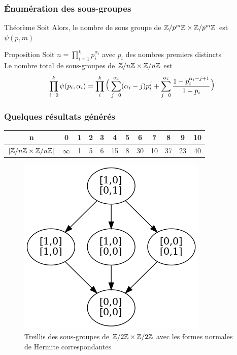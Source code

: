 \documentclass[10pt]{beamer}
\newcommand{\ZpmZ}{\Z/p^m\Z}
\newcommand{\ZZpm}{\ZpmZ \x \ZpmZ}
\begin{document}
\begin{frame}
	\frametitle{\'Enumération des sous-groupes}
	\begin{alertblock}{Théorème}
		Soit
		Alors, le nombre de sous groupe de $\ZZpm$ est $\psi(p,m)$
	\end{alertblock}

	\begin{block}{Proposition}
		Soit $n = \prod\limits_{i = 1}^k p_i^{\alpha_i}$ avec $p_i$ des nombres premiers distincts\\
		Le nombre total de sous-groupes de $\mathbb Z/n\mathbb Z \times \mathbb Z/n\mathbb Z$ est
		$$\prod_{i = 0}^{k} \psi(p_i,\alpha_i)
			= \prod_i^k\mlarge[3](\sum_{j=0}^{\alpha_i}(\alpha_i-j)p_i^j +%
			\sum_{j = 0}^{\alpha_i}\frac{1- p_i^{\alpha_i-j+1}}{1 - p_i}\mlarge[3])$$
	\end{block}
\end{frame}

\begin{frame}
	\frametitle{Quelques résultats générés}
	\begin{center}
		\begin{tabular}{|c|c|c|c|c|c|c|c|c|c|c|c|}
			\hline
			n       & 0     & 1 & 2 & 3 & 4  & 5 & 6  & 7  & 8  & 9  & 10 \tabularnewline
			\hline
			$|\mathbb Z/n\mathbb Z \times \mathbb Z/n\mathbb Z|$ & $\infty$ & 1 & 5 & 6 & 15 & 8 & 30 & 10 & 37 & 23 & 40 \tabularnewline
			\hline
		\end{tabular}
	\end{center}


	\begin{figure}[!h]
		\centering
		\includegraphics[scale=0.4]{Z2ZxZ2Z.png}
		\caption{
			Treillis des sous-groupes de $\mathbb Z/2\mathbb Z \times \mathbb Z/2\mathbb Z$ avec les formes normales de Hermite
			correspondantes
		}
	\end{figure}
\end{frame}
\end{document}
